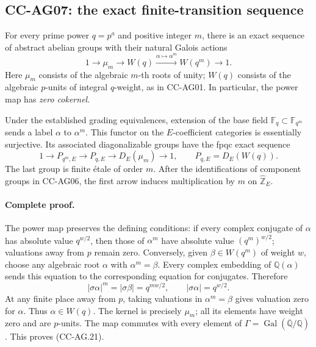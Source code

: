 \documentclass[11pt,a4paper]{article}
\theoremstyle{definition}\newtheorem{definition}[theorem]{Definition}
\theoremstyle{remark}\newtheorem{remark}[theorem]{Remark}
\begin{document}
\subsection{CC-AG07: the exact finite-transition sequence}

For every prime power \(q=p^a\) and positive integer \(m\), there is
an exact sequence of abstract abelian groups with their natural
Galois actions
\[
  1\longrightarrow\mu_m\longrightarrow W(q)
   \xrightarrow{\alpha\mapsto\alpha^m}W(q^m)
   \longrightarrow1.                                      \tag{CC-AG.21}
\]
Here \(\mu_m\) consists of the algebraic \(m\)-th roots of unity;
\(W(q)\) consists of the algebraic \(p\)-units of integral
\(q\)-weight, as in CC-AG01.  In particular, the power map has
\emph{zero cokernel}.

Under the established grading equivalences, extension of the
base field \(\mathbb F_q\subset\mathbb F_{q^m}\) sends a label
\(\alpha\) to \(\alpha^m\).  This functor on the
\(E\)-coefficient categories is essentially surjective.  Its
associated diagonalizable groups have the fpqc exact sequence
\[
  1\longrightarrow P_{q^m,E}\longrightarrow P_{q,E}
   \longrightarrow D_E(\mu_m)\longrightarrow1,
 \qquad P_{q,E}=D_E(W(q)).                                \tag{CC-AG.22}
\]
The last group is finite \'{e}tale of order \(m\).  After the
identifications of component groups in CC-AG06, the first arrow
induces multiplication by \(m\) on
\(\widehat{\mathbb Z}_E\).

\paragraph{Complete proof.}
The power map preserves the defining conditions: if every complex
conjugate of \(\alpha\) has absolute value \(q^{w/2}\), then those
of \(\alpha^m\) have absolute value \((q^m)^{w/2}\); valuations
away from \(p\) remain zero.  Conversely, given
\(\beta\in W(q^m)\) of weight \(w\), choose any algebraic root
\(\alpha\) with \(\alpha^m=\beta\).  Every complex embedding of
\(\mathbb Q(\alpha)\) sends this equation to the corresponding
equation for conjugates.  Therefore
\[
        |\sigma\alpha|^m=|\sigma\beta|=q^{mw/2},
        \qquad |\sigma\alpha|=q^{w/2}.
\]
At any finite place away from \(p\), taking valuations in
\(\alpha^m=\beta\) gives valuation zero for \(\alpha\).
Thus \(\alpha\in W(q)\).  The kernel is precisely \(\mu_m\);
all its elements have weight zero and are \(p\)-units.  The map
commutes with every element of
\(\Gamma=\operatorname{Gal}(\overline{\mathbb Q}/\mathbb Q)\).
This proves (CC-AG.21).
\end{document}
